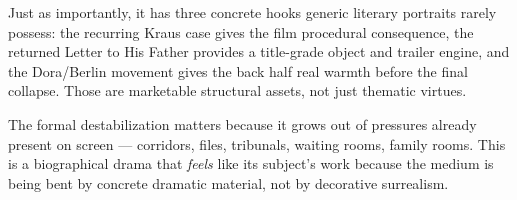 Just as importantly, it has three concrete hooks generic literary portraits rarely possess: the recurring Kraus case gives the film procedural consequence, the returned Letter to His Father provides a title-grade object and trailer engine, and the Dora/Berlin movement gives the back half real warmth before the final collapse. Those are marketable structural assets, not just thematic virtues.

The formal destabilization matters because it grows out of pressures already present on screen --- corridors, files, tribunals, waiting rooms, family rooms. This is a biographical drama that \textit{feels} like its subject's work because the medium is being bent by concrete dramatic material, not by decorative surrealism.
